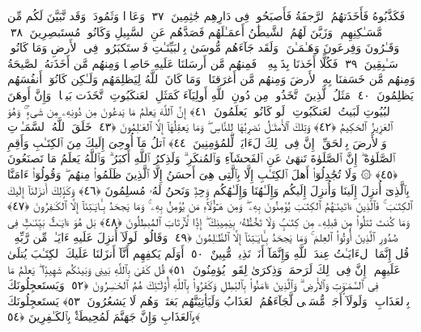  فَكَذَّبُوهُ فَأَخَذَتهُمُ ٱلرَّجفَةُ فَأَصبَحُوا۟ فِى دَارِهِم جَٰثِمِينَ ﴿٣٧﴾
 وَعَادًۭا وَثَمُودَا۟ وَقَد تَّبَيَّنَ لَكُم مِّن مَّسَـٰكِنِهِم ۖ وَزَيَّنَ لَهُمُ ٱلشَّيطَٰنُ أَعمَـٰلَهُم فَصَدَّهُم عَنِ ٱلسَّبِيلِ وَكَانُوا۟ مُستَبصِرِينَ ﴿٣٨﴾
 وَقَـٰرُونَ وَفِرعَونَ وَهَـٰمَـٰنَ ۖ وَلَقَد جَآءَهُم مُّوسَىٰ بِٱلبَيِّنَـٰتِ فَٱستَكبَرُوا۟ فِى ٱلأَرضِ وَمَا كَانُوا۟ سَـٰبِقِينَ ﴿٣٩﴾
 فَكُلًّا أَخَذنَا بِذَنۢبِهِۦ ۖ فَمِنهُم مَّن أَرسَلنَا عَلَيهِ حَاصِبًۭا وَمِنهُم مَّن أَخَذَتهُ ٱلصَّيحَةُ وَمِنهُم مَّن خَسَفنَا بِهِ ٱلأَرضَ وَمِنهُم مَّن أَغرَقنَا ۚ وَمَا كَانَ ٱللَّهُ لِيَظلِمَهُم وَلَـٰكِن كَانُوٓا۟ أَنفُسَهُم يَظلِمُونَ ﴿٤٠﴾
 مَثَلُ ٱلَّذِينَ ٱتَّخَذُوا۟ مِن دُونِ ٱللَّهِ أَولِيَآءَ كَمَثَلِ ٱلعَنكَبُوتِ ٱتَّخَذَت بَيتًۭا ۖ وَإِنَّ أَوهَنَ ٱلبُيُوتِ لَبَيتُ ٱلعَنكَبُوتِ ۖ لَو كَانُوا۟ يَعلَمُونَ ﴿٤١﴾
 إِنَّ ٱللَّهَ يَعلَمُ مَا يَدعُونَ مِن دُونِهِۦ مِن شَىءٍۢ ۚ وَهُوَ ٱلعَزِيزُ ٱلحَكِيمُ ﴿٤٢﴾
 وَتِلكَ ٱلأَمثَـٰلُ نَضرِبُهَا لِلنَّاسِ ۖ وَمَا يَعقِلُهَآ إِلَّا ٱلعَـٰلِمُونَ ﴿٤٣﴾
 خَلَقَ ٱللَّهُ ٱلسَّمَـٰوَٟتِ وَٱلأَرضَ بِٱلحَقِّ ۚ إِنَّ فِى ذَٟلِكَ لَءَايَةًۭ لِّلمُؤمِنِينَ ﴿٤٤﴾
 ٱتلُ مَآ أُوحِىَ إِلَيكَ مِنَ ٱلكِتَـٰبِ وَأَقِمِ ٱلصَّلَوٰةَ ۖ إِنَّ ٱلصَّلَوٰةَ تَنهَىٰ عَنِ ٱلفَحشَآءِ وَٱلمُنكَرِ ۗ وَلَذِكرُ ٱللَّهِ أَكبَرُ ۗ وَٱللَّهُ يَعلَمُ مَا تَصنَعُونَ ﴿٤٥﴾
 ۞ وَلَا تُجَٰدِلُوٓا۟ أَهلَ ٱلكِتَـٰبِ إِلَّا بِٱلَّتِى هِىَ أَحسَنُ إِلَّا ٱلَّذِينَ ظَلَمُوا۟ مِنهُم ۖ وَقُولُوٓا۟ ءَامَنَّا بِٱلَّذِىٓ أُنزِلَ إِلَينَا وَأُنزِلَ إِلَيكُم وَإِلَـٰهُنَا وَإِلَـٰهُكُم وَٟحِدٌۭ وَنَحنُ لَهُۥ مُسلِمُونَ ﴿٤٦﴾
 وَكَذَٟلِكَ أَنزَلنَآ إِلَيكَ ٱلكِتَـٰبَ ۚ فَٱلَّذِينَ ءَاتَينَـٰهُمُ ٱلكِتَـٰبَ يُؤمِنُونَ بِهِۦ ۖ وَمِن هَـٰٓؤُلَآءِ مَن يُؤمِنُ بِهِۦ ۚ وَمَا يَجحَدُ بِـَٔايَـٰتِنَآ إِلَّا ٱلكَـٰفِرُونَ ﴿٤٧﴾
 وَمَا كُنتَ تَتلُوا۟ مِن قَبلِهِۦ مِن كِتَـٰبٍۢ وَلَا تَخُطُّهُۥ بِيَمِينِكَ ۖ إِذًۭا لَّٱرتَابَ ٱلمُبطِلُونَ ﴿٤٨﴾
 بَل هُوَ ءَايَـٰتٌۢ بَيِّنَـٰتٌۭ فِى صُدُورِ ٱلَّذِينَ أُوتُوا۟ ٱلعِلمَ ۚ وَمَا يَجحَدُ بِـَٔايَـٰتِنَآ إِلَّا ٱلظَّـٰلِمُونَ ﴿٤٩﴾
 وَقَالُوا۟ لَولَآ أُنزِلَ عَلَيهِ ءَايَـٰتٌۭ مِّن رَّبِّهِۦ ۖ قُل إِنَّمَا ٱلءَايَـٰتُ عِندَ ٱللَّهِ وَإِنَّمَآ أَنَا۠ نَذِيرٌۭ مُّبِينٌ ﴿٥٠﴾
 أَوَلَم يَكفِهِم أَنَّآ أَنزَلنَا عَلَيكَ ٱلكِتَـٰبَ يُتلَىٰ عَلَيهِم ۚ إِنَّ فِى ذَٟلِكَ لَرَحمَةًۭ وَذِكرَىٰ لِقَومٍۢ يُؤمِنُونَ ﴿٥١﴾
 قُل كَفَىٰ بِٱللَّهِ بَينِى وَبَينَكُم شَهِيدًۭا ۖ يَعلَمُ مَا فِى ٱلسَّمَـٰوَٟتِ وَٱلأَرضِ ۗ وَٱلَّذِينَ ءَامَنُوا۟ بِٱلبَٰطِلِ وَكَفَرُوا۟ بِٱللَّهِ أُو۟لَـٰٓئِكَ هُمُ ٱلخَـٰسِرُونَ ﴿٥٢﴾
 وَيَستَعجِلُونَكَ بِٱلعَذَابِ ۚ وَلَولَآ أَجَلٌۭ مُّسَمًّۭى لَّجَآءَهُمُ ٱلعَذَابُ وَلَيَأتِيَنَّهُم بَغتَةًۭ وَهُم لَا يَشعُرُونَ ﴿٥٣﴾
 يَستَعجِلُونَكَ بِٱلعَذَابِ وَإِنَّ جَهَنَّمَ لَمُحِيطَةٌۢ بِٱلكَـٰفِرِينَ ﴿٥٤﴾

